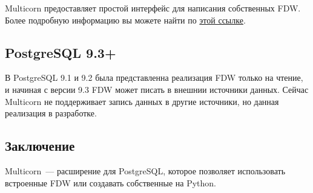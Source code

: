 Multicorn предоставляет простой интерфейс для написания собственных FDW. Более подробную информацию вы можете найти по \href{http://multicorn.org/implementing-an-fdw/}{этой ссылке}.


\subsection{PostgreSQL 9.3+}

В PostgreSQL 9.1 и 9.2 была представленна реализация FDW только на чтение, и начиная с версии 9.3 FDW может писать в внешнии источники данных. Сейчас Multicorn не поддерживает запись данных в другие источники, но данная реализация в разработке.

\subsection{Заключение}

Multicorn~--- расширение для PostgreSQL, которое позволяет использовать встроенные FDW или создавать собственные на Python.
